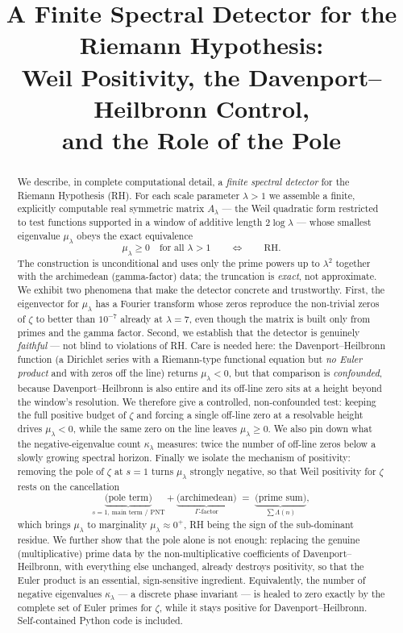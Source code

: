 \documentclass[11pt]{amsart}
\title[A Finite Spectral Detector for RH]{A Finite Spectral Detector for the Riemann Hypothesis: \\ Weil Positivity, the Davenport--Heilbronn Control, \\ and the Role of the Pole}
\date{}
\theoremstyle{definition}
\theoremstyle{remark}
\newcommand{\lam}{\lambda}
\begin{document}
\begin{abstract}
We describe, in complete computational detail, a \emph{finite spectral detector} for the Riemann Hypothesis (RH). For each scale parameter $\lam>1$ we assemble a finite, explicitly computable real symmetric matrix $A_\lam$ --- the Weil quadratic form restricted to test functions supported in a window of additive length $2\log\lam$ --- whose smallest eigenvalue $\mu_\lam$ obeys the exact equivalence
\[
\mu_\lam \ge 0 \quad\text{for all } \lam>1 \qquad\Longleftrightarrow\qquad \text{RH}.
\]
The construction is unconditional and uses only the prime powers up to $\lam^2$ together with the archimedean (gamma-factor) data; the truncation is \emph{exact}, not approximate. We exhibit two phenomena that make the detector concrete and trustworthy. First, the eigenvector for $\mu_\lam$ has a Fourier transform whose zeros reproduce the non-trivial zeros of $\zeta$ to better than $10^{-7}$ already at $\lam=7$, even though the matrix is built only from primes and the gamma factor. Second, we establish that the detector is genuinely \emph{faithful} --- not blind to violations of RH. Care is needed here: the Davenport--Heilbronn function (a Dirichlet series with a Riemann-type functional equation but \emph{no Euler product} and with zeros off the line) returns $\mu_\lam<0$, but that comparison is \emph{confounded}, because Davenport--Heilbronn is also entire and its off-line zero sits at a height beyond the window's resolution. We therefore give a controlled, non-confounded test: keeping the full positive budget of $\zeta$ and forcing a single off-line zero at a resolvable height drives $\mu_\lam<0$, while the same zero on the line leaves $\mu_\lam\ge0$. We also pin down what the negative-eigenvalue count $\kappa_\lam$ measures: twice the number of off-line zeros below a slowly growing spectral horizon. Finally we isolate the mechanism of positivity: removing the pole of $\zeta$ at $s=1$ turns $\mu_\lam$ strongly negative, so that Weil positivity for $\zeta$ rests on the cancellation
\[
\underbrace{\text{(pole term)}}_{s=1,\ \text{main term / PNT}} + \underbrace{\text{(archimedean)}}_{\Gamma\text{-factor}} \;=\; \underbrace{\text{(prime sum)}}_{\sum \Lambda(n)},
\]
which brings $\mu_\lam$ to marginality $\mu_\lam\approx 0^+$, RH being the sign of the sub-dominant residue. We further show that the pole alone is not enough: replacing the genuine (multiplicative) prime data by the non-multiplicative coefficients of Davenport--Heilbronn, with everything else unchanged, already destroys positivity, so that the Euler product is an essential, sign-sensitive ingredient. Equivalently, the number of negative eigenvalues $\kappa_\lam$ --- a discrete phase invariant --- is healed to zero exactly by the complete set of Euler primes for $\zeta$, while it stays positive for Davenport--Heilbronn. Self-contained Python code is included.
\end{abstract}
\maketitle
\end{document}
